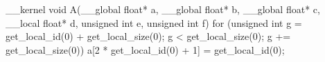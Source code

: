 __kernel void A(__global float* a, __global float* b, __global float* c, __local float* d, unsigned int e, unsigned int f) {
  for (unsigned int g = get_local_id(0) + get_local_size(0); g < get_local_size(0); g += get_local_size(0)) {
    a[2 * get_local_id(0) + 1] = get_local_id(0);
  }
}
